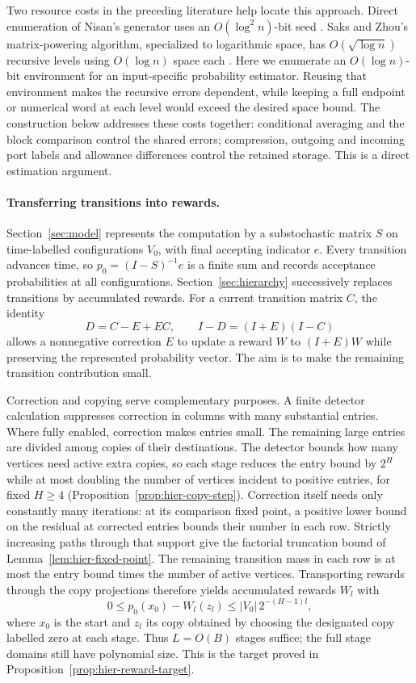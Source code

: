 Two resource costs in the preceding literature help locate this approach.
Direct enumeration of Nisan's generator uses an $O(\log^2 n)$-bit seed
\cite{Nisan1992}. Saks and Zhou's matrix-powering algorithm, specialized
to logarithmic space, has $O(\sqrt{\log n})$ recursive levels using
$O(\log n)$ space each \cite[Section~1, pp.~377--379]{SaksZhou1999}.
Here we enumerate an $O(\log n)$-bit environment for an input-specific
probability estimator. Reusing that environment makes the recursive
errors dependent, while keeping a full endpoint or numerical word at
each level would exceed the desired space bound. The construction below
addresses these costs together: conditional averaging and the block
comparison control the shared errors; compression, outgoing and incoming port labels and
allowance differences control the retained storage. This is a direct
estimation argument.

\paragraph{Transferring transitions into rewards.}
Section~\ref{sec:model} represents the computation by a substochastic
matrix $S$ on time-labelled configurations $V_0$, with final accepting
indicator $e$. Every transition advances time, so
$p_0=(I-S)^{-1}e$ is a finite sum and records acceptance probabilities
at all configurations. Section~\ref{sec:hierarchy} successively replaces
transitions by accumulated rewards. For a current transition matrix $C$,
the identity
\[
 D=C-E+EC,\qquad I-D=(I+E)(I-C)
\]
allows a nonnegative correction $E$ to update a reward $W$ to $(I+E)W$
while preserving the represented probability vector. The aim is to make
the remaining transition contribution small.

Correction and copying serve complementary purposes. A finite detector
calculation suppresses correction in columns with many substantial
entries. Where fully enabled, correction makes entries small. The
remaining large entries are divided among copies of their destinations. The detector
bounds how many vertices need active extra copies, so each stage reduces
the entry bound by $2^H$ while at most doubling the number of vertices
incident to positive entries, for fixed $H\ge4$
(Proposition~\ref{prop:hier-copy-step}). Correction itself needs only
constantly many iterations: at its comparison fixed point, a positive
lower bound on the residual at corrected entries bounds their number
in each row. Strictly increasing paths through that support give the
factorial truncation bound of Lemma~\ref{lem:hier-fixed-point}.
The remaining transition mass in each row is at most the entry bound
times the number of active vertices. Transporting rewards through the
copy projections therefore yields accumulated rewards $W_l$ with
\[
 0\le p_0(x_0)-W_l(z_l)\le |V_0|\,2^{-(H-1)l},
\]
where $x_0$ is the start and $z_l$ its copy obtained by choosing the
designated copy labelled zero at each stage. Thus $L=O(B)$ stages suffice;
the full stage domains still have polynomial size. This is the target
proved in Proposition~\ref{prop:hier-reward-target}.

